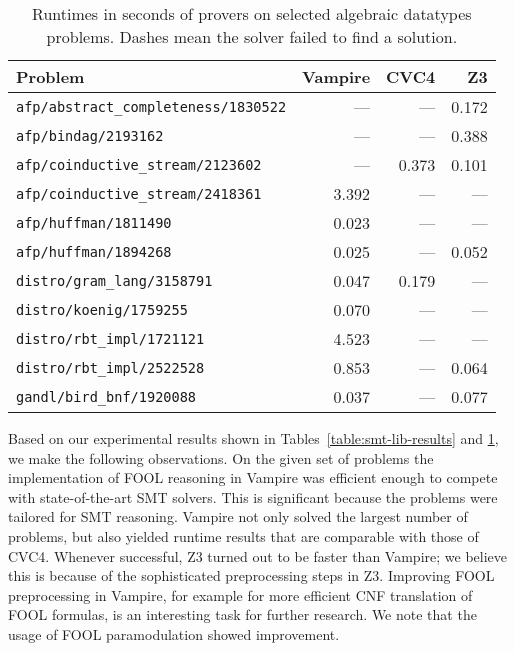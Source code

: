 \newcommand{\timeout}{---}
\newcommand{\gaveup}{---}
\begin{table}[tb]
  \caption{Runtimes in seconds of provers on selected algebraic datatypes problems. Dashes mean the solver failed to find a solution.}%
  \begin{center}
  \begin{tabular}{lrrr}
    \hline Problem & Vampire & CVC4 & Z3 \\ \hline
    \verb'afp/abstract_completeness/1830522' & \timeout & \timeout & 0.172 \\
    \verb'afp/bindag/2193162' & \timeout & \gaveup & 0.388 \\
    \verb'afp/coinductive_stream/2123602' & \timeout & 0.373 & 0.101 \\
    \verb'afp/coinductive_stream/2418361' & 3.392 & \timeout & \timeout \\
    \verb'afp/huffman/1811490' & 0.023 & \gaveup & \timeout \\
    \verb'afp/huffman/1894268' & 0.025 & \gaveup & 0.052 \\
    \verb'distro/gram_lang/3158791' & 0.047 & 0.179 & \timeout \\
    \verb'distro/koenig/1759255' & 0.070 & \timeout & \timeout \\
    \verb'distro/rbt_impl/1721121' & 4.523 & \timeout & \timeout \\
    \verb'distro/rbt_impl/2522528' & 0.853 & \gaveup & 0.064 \\
    \verb'gandl/bird_bnf/1920088' & 0.037 & \timeout & 0.077
  \end{tabular}
  \end{center}
  \label{table:smt-lib-nontrivial}
\end{table}

Based on our experimental results shown in Tables~\ref{table:smt-lib-results} and \ref{table:smt-lib-nontrivial}, we make the following observations. On the given set of problems the implementation of FOOL reasoning in Vampire was efficient enough to compete with state-of-the-art SMT solvers. This is significant because the problems were tailored for SMT reasoning. Vampire not only solved the largest number of problems, but also yielded runtime results that are comparable with those of CVC4. Whenever successful, Z3 turned out to be faster than Vampire; we believe this is because of the sophisticated preprocessing steps in Z3. Improving FOOL preprocessing in Vampire, for example for more efficient CNF translation of FOOL formulas, is an interesting task for further research. We note that the usage of FOOL paramodulation showed improvement.